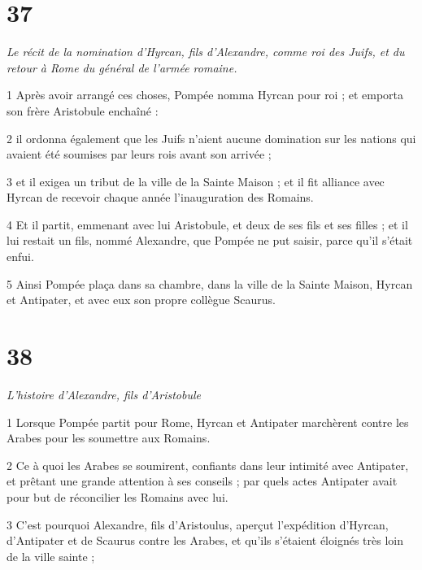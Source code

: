 \chapter{37}

\par \textit{Le récit de la nomination d'Hyrcan, fils d'Alexandre, comme roi des Juifs, et du retour à Rome du général de l'armée romaine.}

\par 1 Après avoir arrangé ces choses, Pompée nomma Hyrcan pour roi ; et emporta son frère Aristobule enchaîné :

\par 2 il ordonna également que les Juifs n'aient aucune domination sur les nations qui avaient été soumises par leurs rois avant son arrivée ;

\par 3 et il exigea un tribut de la ville de la Sainte Maison ; et il fit alliance avec Hyrcan de recevoir chaque année l'inauguration des Romains.

\par 4 Et il partit, emmenant avec lui Aristobule, et deux de ses fils et ses filles ; et il lui restait un fils, nommé Alexandre, que Pompée ne put saisir, parce qu'il s'était enfui.

\par 5 Ainsi Pompée plaça dans sa chambre, dans la ville de la Sainte Maison, Hyrcan et Antipater, et avec eux son propre collègue Scaurus.

\chapter{38}

\par \textit{L'histoire d'Alexandre, fils d'Aristobule}

\par 1 Lorsque Pompée partit pour Rome, Hyrcan et Antipater marchèrent contre les Arabes pour les soumettre aux Romains.

\par 2 Ce à quoi les Arabes se soumirent, confiants dans leur intimité avec Antipater, et prêtant une grande attention à ses conseils ; par quels actes Antipater avait pour but de réconcilier les Romains avec lui.

\par 3 C'est pourquoi Alexandre, fils d'Aristoulus, aperçut l'expédition d'Hyrcan, d'Antipater et de Scaurus contre les Arabes, et qu'ils s'étaient éloignés très loin de la ville sainte ;

